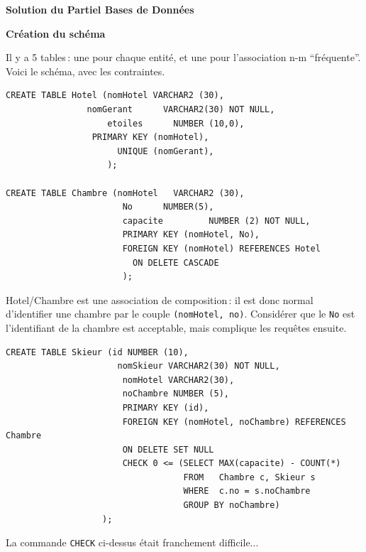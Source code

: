 \documentclass{article}
\begin{document}
\begin{center}
{\Large\bf Solution du  Partiel Bases de Donn\'ees}
\end{center}


\vspace*{2cm}

\smallskip
{\bf Cr\'eation du sch\'ema}

Il y a 5 tables\,: une pour chaque entit\'e, et une pour
      l'association n-m ``fr\'equente''. Voici le sch\'ema, avec
       les contraintes.

\begin{verbatim}
CREATE TABLE Hotel (nomHotel VARCHAR2 (30),
	            nomGerant      VARCHAR2(30) NOT NULL,
                    etoiles      NUMBER (10,0),
	             PRIMARY KEY (nomHotel), 
                      UNIQUE (nomGerant),
                    );

CREATE TABLE Chambre (nomHotel   VARCHAR2 (30),
                       No      NUMBER(5),
                       capacite         NUMBER (2) NOT NULL,
                       PRIMARY KEY (nomHotel, No),
                       FOREIGN KEY (nomHotel) REFERENCES Hotel
                         ON DELETE CASCADE
                       );
\end{verbatim}
Hotel/Chambre est une association de composition\,: il
est donc normal d'identifier une chambre par
le couple {\tt (nomHotel, no)}. Consid\'erer que le
{\tt No} est l'identifiant de la chambre est acceptable,
mais complique les requ\^etes ensuite.

\begin{verbatim} 
CREATE TABLE Skieur (id NUMBER (10),
                      nomSkieur VARCHAR2(30) NOT NULL,
                       nomHotel VARCHAR2(30),
                       noChambre NUMBER (5),
                       PRIMARY KEY (id),
                       FOREIGN KEY (nomHotel, noChambre) REFERENCES Chambre
                       ON DELETE SET NULL
                       CHECK 0 <= (SELECT MAX(capacite) - COUNT(*)
                                   FROM   Chambre c, Skieur s
                                   WHERE  c.no = s.noChambre
                                   GROUP BY noChambre)               
                   );  
\end{verbatim}
La commande {\tt CHECK} ci-dessus \'etait franchement difficile...
\end{document}
